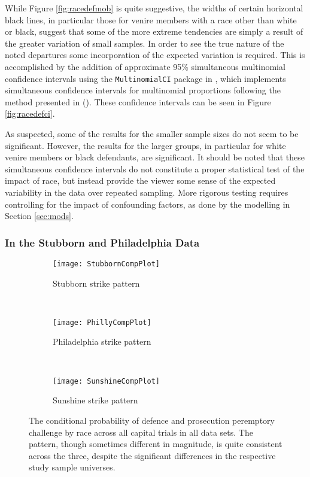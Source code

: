 While Figure \ref{fig:racedefmob} is quite suggestive, the widths of certain horizontal black lines, in particular those for
venire members with a race other than white or black, suggest that some of the more extreme tendencies are simply a result
of the greater variation of small samples. In order to see the true nature of the noted departures some
incorporation of the expected variation is required. This is accomplished by the addition of
approximate 95\% simultaneous multinomial confidence intervals using the \texttt{MultinomialCI} package in \R, which implements
simultaneous confidence intervals for multinomial proportions following the method presented in (\cite{sison1995}). These confidence
intervals can be seen in Figure \ref{fig:racedefci}.

As suspected, some of the results for the smaller sample sizes do not seem to be significant. However, the results for the larger groups,
in particular for white venire members or black defendants, are significant. It should be noted that these simultaneous
confidence intervals do not constitute a proper statistical test of the impact of race, but instead
provide the viewer some sense of the expected variability in the data over repeated sampling. More rigorous testing requires
controlling for the impact of confounding factors, as done by the modelling in Section \ref{sec:mods}.

\subsubsection{In the Stubborn and Philadelphia Data}

\begin{figure}[h!]
  \centering
  \begin{subfigure}{0.32\textwidth}
    \texttt{[image: StubbornCompPlot]}
    \caption{\footnotesize Stubborn strike pattern}
    \label{fig:stubcomp}
  \end{subfigure}
  ~
  \begin{subfigure}{0.32\textwidth}
    \texttt{[image: PhillyCompPlot]}
    \caption{\footnotesize Philadelphia strike pattern}
    \label{fig:philcomp}
  \end{subfigure}
  ~
  \begin{subfigure}{0.32\textwidth}
    \texttt{[image: SunshineCompPlot]}
    \caption{\footnotesize Sunshine strike pattern}
    \label{fig:suncomp}
  \end{subfigure}
  \caption[Strikes by Racial Combination (All Capital Trial Data)]
  {\footnotesize The conditional probability of defence and prosecution peremptory challenge by race across all
    capital trials in all data sets. The pattern, though sometimes different in magnitude, is quite consistent across the three,
    despite the significant differences in the respective study sample universes.}
  \label{fig:racedefalldata}
\end{figure}

